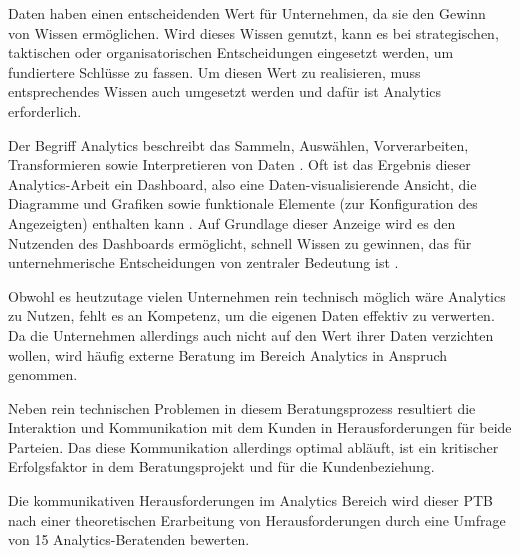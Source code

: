 \documentclass[../main.tex]{subfiles}
\begin{document}
Daten haben einen entscheidenden Wert für Unternehmen, da sie den Gewinn von Wissen ermöglichen.
Wird dieses Wissen genutzt, kann es bei strategischen, taktischen oder organisatorischen Entscheidungen eingesetzt werden, um fundiertere Schlüsse zu fassen.
Um diesen Wert zu realisieren, muss entsprechendes Wissen auch umgesetzt werden und dafür ist Analytics erforderlich.
\autocite{monino2021data, gupta2020digital, sarikaya2018we}

Der Begriff Analytics beschreibt das Sammeln, Auswählen, Vorverarbeiten, Transformieren sowie Interpretieren von Daten \autocite{tsai2015big}.
Oft ist das Ergebnis dieser Analytics-Arbeit ein Dashboard, also eine Daten-visualisierende Ansicht, die Diagramme und Grafiken sowie funktionale Elemente (zur Konfiguration des Angezeigten) enthalten kann \autocite{sarikaya2018we}.
Auf Grundlage dieser Anzeige wird es den Nutzenden des Dashboards ermöglicht, schnell Wissen zu gewinnen, das für unternehmerische Entscheidungen von zentraler Bedeutung ist \autocite{sarikaya2018we}.

Obwohl es heutzutage vielen Unternehmen rein technisch möglich wäre Analytics zu Nutzen, fehlt es an Kompetenz, um die eigenen Daten effektiv zu verwerten.
Da die Unternehmen allerdings auch nicht auf den Wert ihrer Daten verzichten wollen, wird häufig externe Beratung im Bereich Analytics in Anspruch genommen.
\autocite{gupta2020achieving,chen2012business}

Neben rein technischen Problemen in diesem Beratungsprozess resultiert die Interaktion und Kommunikation mit dem Kunden in Herausforderungen für beide Parteien.
Das diese Kommunikation allerdings optimal abläuft, ist ein kritischer Erfolgsfaktor in dem Beratungsprojekt und für die Kundenbeziehung.
\autocite{appelbaum2005critical}

Die kommunikativen Herausforderungen im Analytics Bereich wird dieser PTB nach einer theoretischen Erarbeitung von Herausforderungen durch eine Umfrage von 15 Analytics-Beratenden bewerten.
\end{document}
